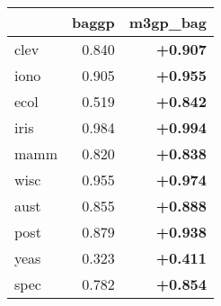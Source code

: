 \begin{tabular}{lrr}
\toprule
{} &  baggp &  m3gp\_bag \\
\midrule
clev & 0.840 & \textbf{+0.907} \\
iono & 0.905 & \textbf{+0.955} \\
ecol & 0.519 & \textbf{+0.842} \\
iris & 0.984 & \textbf{+0.994} \\
mamm & 0.820 & \textbf{+0.838} \\
wisc & 0.955 & \textbf{+0.974} \\
aust & 0.855 & \textbf{+0.888} \\
post & 0.879 & \textbf{+0.938} \\
yeas & 0.323 & \textbf{+0.411} \\
spec & 0.782 & \textbf{+0.854} \\
\bottomrule
\end{tabular}
